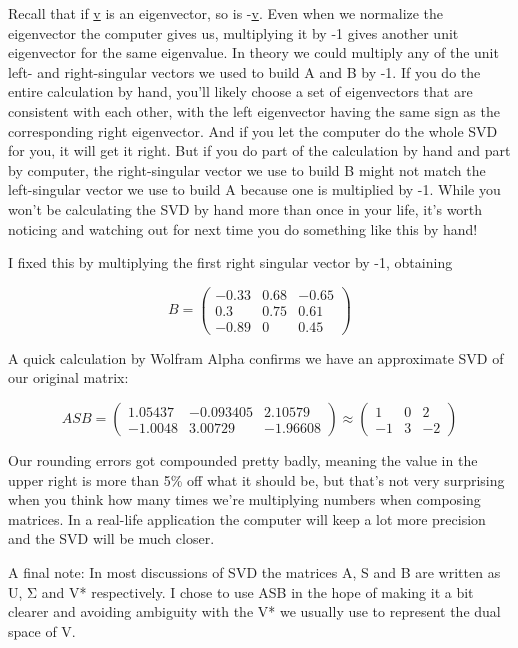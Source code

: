 \documentclass[oneside,english]{amsbook}
\numberwithin{section}{chapter}
\theoremstyle{plain}
\theoremstyle{definition}
\begin{document}
Recall that if \ul{v} is an eigenvector, so is -\ul{v}. Even when we
normalize the eigenvector the computer gives us, multiplying it by -1
gives another unit eigenvector for the same eigenvalue. In theory we
could multiply any of the unit left- and right-singular vectors we used
to build A and B by -1. If you do the entire calculation by hand, you'll
likely choose a set of eigenvectors that are consistent with each other,
with the left eigenvector having the same sign as the corresponding
right eigenvector. And if you let the computer do the whole SVD for you,
it will get it right. But if you do part of the calculation by hand and
part by computer, the right-singular vector we use to build B might not
match the left-singular vector we use to build A because one is
multiplied by -1. While you won't be calculating the SVD by hand more
than once in your life, it's worth noticing and watching out for next
time you do something like this by hand!

I fixed this by multiplying the first right singular vector by -1,
obtaining

\[B = \begin{pmatrix}
	- 0.33 & 0.68 & - 0.65 \\
	0.3 & 0.75 & 0.61 \\
	- 0.89 & 0 & 0.45
\end{pmatrix}\]

A quick calculation by Wolfram Alpha confirms we have an approximate SVD
of our original matrix:

\[{ASB = \begin{pmatrix}
		1.05437 & - 0.093405 & 2.10579 \\
		- 1.0048 & 3.00729 & - 1.96608
	\end{pmatrix}
}{\approx \begin{pmatrix}
		1 & 0 & 2 \\
		- 1 & 3 & - 2
\end{pmatrix}}\]

Our rounding errors got compounded pretty badly, meaning the value in
the upper right is more than 5\% off what it should be, but that's not
very surprising when you think how many times we're multiplying numbers
when composing matrices. In a real-life application the computer will
keep a lot more precision and the SVD will be much closer.

A final note: In most discussions of SVD the matrices A, S and B are
written as U, Σ and V* respectively. I chose to use ASB in the hope of
making it a bit clearer and avoiding ambiguity with the V* we usually
use to represent the dual space of V.
\end{document}
